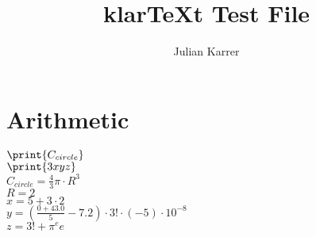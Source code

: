 \documentclass[oneside, a4paper]{article}
\author{Julian Karrer}
\title{klarTeXt Test File}
\begin{document}
\maketitle
\section*{Arithmetic}


\begin{program}

$\print{C_{circle}}$\\
$\print{3xyz}$\\
$C_{circle} = \frac{4}{3}\pi \cdot R^3$\\
$R = 2$\\
$x = 5+3\cdot 2$\\
$y = \left(\frac{0+43.0}{5}-7.2\right)\cdot 3! \cdot (-5) \cdot 10^{-8}$\\
$z = 3! + \pi^e e$\\

\end{program}
\end{document}
